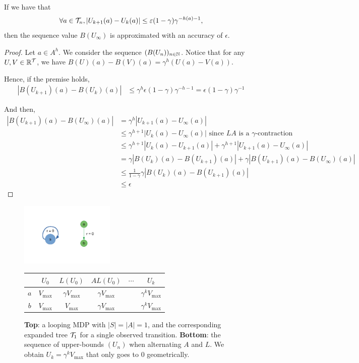 \documentclass{article}
\begin{document}
\begin{proposition}
If we have that
\[\forall a\in\mathcal{T}_n, |U_{k+1}(a) - U_k(a)| \leq \varepsilon (1-\gamma)\gamma^{-h(a)-1},\]
then the sequence value $B(U_{\infty})$ is approximated with an accuracy of $\epsilon$.
\end{proposition}
\begin{proof}
Let $a\in A^h$. We consider the sequence $(B(U_n))_{n\in\mathbb{N}}$.
Notice that for any $U,V\in\mathbb{R}^{\mathcal{T}}$, we have $B(U)(a)-B(V)(a)=\gamma^h(U(a)-V(a))$.

Hence, if the premise holds,
\begin{align*}
    |B(U_{k+1})(a) - B(U_{k})(a)| &\leq \gamma^h\epsilon (1-\gamma)\gamma^{-h-1} = \epsilon (1-\gamma)\gamma^{-1}
\end{align*}

And then, 
\begin{align*}
|B(U_{k+1})(a) - B(U_\infty)(a)| &= \gamma^h |U_{k+1}(a) - U_\infty(a)|\\
&\leq \gamma^{h+1}|U_{k}(a) - U_\infty(a)| \text{ since $LA$ is a $\gamma$-contraction}\\
&\leq \gamma^{h+1}|U_{k}(a) - U_{k+1}(a)| + \gamma^{h+1}|U_{k+1}(a) - U_\infty(a)|\\
&= \gamma|B(U_{k})(a) - B(U_{k+1})(a)| + \gamma |B(U_{k+1})(a) - B(U_\infty)(a)|\\
&\leq \frac{1}{1-\gamma}\gamma |B(U_{k})(a) - B(U_{k+1})(a)|\\
&\leq\epsilon
\end{align*}

\end{proof}

\begin{figure}
    \centering
    \includegraphics[trim=2cm 2cm 2cm 2cm, clip, width=0.4\textwidth]{img/simple_loop.pdf}\\
    \begin{tabular}{cccccc}
         \toprule
         & $U_0$ & $L (U_0)$ & $AL(U_0)$ & $\cdots$ & $U_k$ \\
         \midrule
         $a$ & $V_{\max}$ & $\gamma V_{\max}$ & $\gamma V_{\max}$ && $\gamma^k V_{\max}$\\
         $b$ & $V_{\max}$ & $V_{\max}$ & $\gamma V_{\max}$ && $\gamma^k V_{\max}$\\
         \bottomrule
    \end{tabular}
    \caption{\textbf{Top}: a looping MDP with $|S|=|A|=1$, and the corresponding expanded tree $\mathcal{T}_1$ for a single observed transition. \textbf{Bottom}: the sequence of upper-bounds $(U_n)$ when alternating $A$ and $L$. We obtain $U_k = \gamma^k V_{\max}$ that only goes to $0$ geometrically.}
    \label{fig:simple_loop}
\end{figure}
\end{document}
